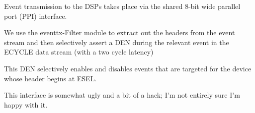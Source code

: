 Event transmission to the DSPs takes place via the shared 8-bit wide
parallel port (PPI) interface.

We use the eventtx-Filter module to extract out the headers from the
event stream and then selectively assert a DEN during the relevant
event in the ECYCLE data stream (with a two cycle latency)

This DEN selectively enables and disables events that are targeted for
the device whose header begins at ESEL.

This interface is somewhat ugly and a bit of a hack; I'm not entirely
sure I'm happy with it.


